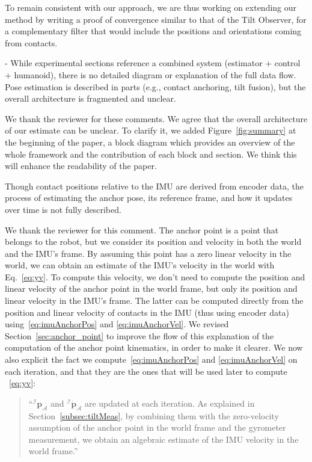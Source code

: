 To remain consistent with our approach, we are thus working on extending our method by writing a proof of convergence similar to that of the Tilt Observer, for a complementary filter that would include the positions and orientations coming from contacts. 




\begin{revquote}
- While experimental sections reference a combined system (estimator + control + humanoid), there is no detailed diagram or explanation of the full data flow. Pose estimation is described in parts (e.g., contact anchoring, tilt fusion), but the overall architecture is fragmented and unclear.
\end{revquote}


We thank the reviewer for these comments. We agree that the overall architecture of our estimate can be unclear. To clarify it, we added Figure~\ref{fig:summary} at the beginning of the paper, a block diagram which provides an overview of the whole framework and the contribution of each block and section. We think this will enhance the readability of the paper.

\begin{revquote}
Though contact positions relative to the IMU are derived from encoder data, the process of estimating the anchor pose, its reference frame, and how it updates over time is not fully described.
\end{revquote}

We thank the reviewer for this comment. The anchor point is a point that belongs to the robot, but we consider its position and velocity in both the world and the IMU's frame. By assuming this point has a zero linear velocity in the world, we can obtain an estimate of the IMU's velocity in the world with Eq.~\eqref{eq:yv}. To compute this velocity, we don't need to compute the position and linear velocity of the anchor point in the world frame, but only its position and linear velocity in the IMU's frame. The latter can be computed directly from the position and linear velocity of contacts in the IMU (thus using encoder data) using~\eqref{eq:imuAnchorPos} and \eqref{eq:imuAnchorVel}. 
We revised Section~\ref{sec:anchor_point} to improve the flow of this explanation of the computation of the anchor point kinematics, in order to make it clearer. We now also explicit the fact we compute~\eqref{eq:imuAnchorPos} and \eqref{eq:imuAnchorVel} on each iteration, and that they are the ones that will be used later to compute ~\eqref{eq:yv}:
\begin{quote}
  ``${^{\mathcal{I}}}\boldsymbol{p}_{\mathcal{A}}$ and ${^{\mathcal{I}}} \dot{\boldsymbol{p}}_{\mathcal{A}}$ are updated at each iteration. As explained in Section~\ref{subsec:tiltMeas}, by combining them with the zero-velocity assumption of the anchor point in the world frame and the gyrometer measurement, we obtain an algebraic estimate of the IMU velocity in the world frame.''
\end{quote}

